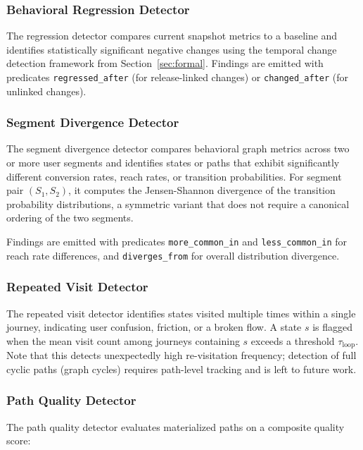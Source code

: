 \documentclass[12pt, a4paper]{article}
\begin{document}
\subsubsection{Behavioral Regression Detector}

The regression detector compares current snapshot metrics to a baseline and identifies statistically significant negative changes using the temporal change detection framework from Section~\ref{sec:formal}. Findings are emitted with predicates \texttt{regressed\_after} (for release-linked changes) or \texttt{changed\_after} (for unlinked changes).

\subsubsection{Segment Divergence Detector}

The segment divergence detector compares behavioral graph metrics across two or more user segments and identifies states or paths that exhibit significantly different conversion rates, reach rates, or transition probabilities. For segment pair $(S_1, S_2)$, it computes the Jensen-Shannon divergence of the transition probability distributions, a symmetric variant that does not require a canonical ordering of the two segments.

Findings are emitted with predicates \texttt{more\_common\_in} and \texttt{less\_common\_in} for reach rate differences, and \texttt{diverges\_from} for overall distribution divergence.

\subsubsection{Repeated Visit Detector}

The repeated visit detector identifies states visited multiple times within a single journey, indicating user confusion, friction, or a broken flow. A state $s$ is flagged when the mean visit count among journeys containing $s$ exceeds a threshold $\tau_{\text{loop}}$. Note that this detects unexpectedly high re-visitation frequency; detection of full cyclic paths (graph cycles) requires path-level tracking and is left to future work.

\subsubsection{Path Quality Detector}

The path quality detector evaluates materialized paths on a composite quality score:
\end{document}
